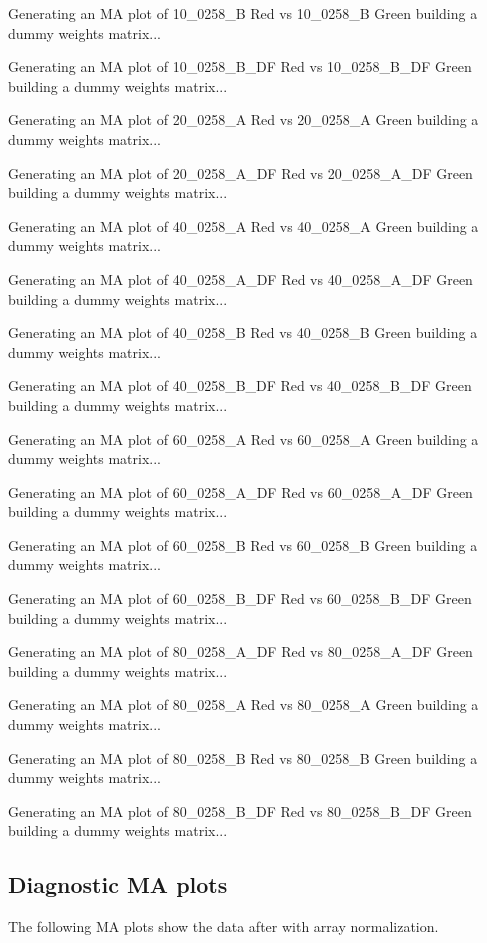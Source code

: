 \documentclass[titlepage]{article}
\begin{document}
\begin{Schunk}
\begin{Soutput}
Generating an MA plot of  10_0258_B Red vs 10_0258_B Green 
building a dummy weights matrix... 

Generating an MA plot of  10_0258_B_DF Red vs 10_0258_B_DF Green 
building a dummy weights matrix... 

Generating an MA plot of  20_0258_A Red vs 20_0258_A Green 
building a dummy weights matrix... 

Generating an MA plot of  20_0258_A_DF Red vs 20_0258_A_DF Green 
building a dummy weights matrix... 

Generating an MA plot of  40_0258_A Red vs 40_0258_A Green 
building a dummy weights matrix... 

Generating an MA plot of  40_0258_A_DF Red vs 40_0258_A_DF Green 
building a dummy weights matrix... 

Generating an MA plot of  40_0258_B Red vs 40_0258_B Green 
building a dummy weights matrix... 

Generating an MA plot of  40_0258_B_DF Red vs 40_0258_B_DF Green 
building a dummy weights matrix... 

Generating an MA plot of  60_0258_A Red vs 60_0258_A Green 
building a dummy weights matrix... 

Generating an MA plot of  60_0258_A_DF Red vs 60_0258_A_DF Green 
building a dummy weights matrix... 

Generating an MA plot of  60_0258_B Red vs 60_0258_B Green 
building a dummy weights matrix... 

Generating an MA plot of  60_0258_B_DF Red vs 60_0258_B_DF Green 
building a dummy weights matrix... 

Generating an MA plot of  80_0258_A_DF Red vs 80_0258_A_DF Green 
building a dummy weights matrix... 

Generating an MA plot of  80_0258_A Red vs 80_0258_A Green 
building a dummy weights matrix... 

Generating an MA plot of  80_0258_B Red vs 80_0258_B Green 
building a dummy weights matrix... 

Generating an MA plot of  80_0258_B_DF Red vs 80_0258_B_DF Green 
building a dummy weights matrix... 
\end{Soutput}
\end{Schunk}
\pagebreak
\subsection{Diagnostic MA plots}
The following MA plots show the data after with array normalization.
\end{document}
